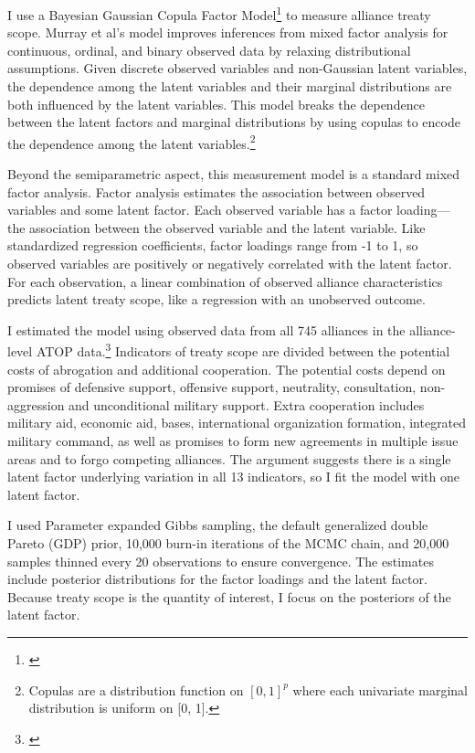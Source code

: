 \documentclass[12pt]{article}
\begin{document}
I use a Bayesian Gaussian Copula Factor Model\footnote{\cite{Murrayetal2013}} to measure alliance treaty scope. 
Murray et al's model improves inferences from mixed factor analysis for continuous, ordinal, and binary observed data by relaxing distributional assumptions. 
Given discrete observed variables and non-Gaussian latent variables, the dependence among the latent variables and their marginal distributions are both influenced by the latent variables.
This model breaks the dependence between the latent factors and marginal distributions by using copulas to encode the dependence among the latent variables.\footnote{Copulas are a distribution function on $[0, 1]^p$ where each univariate marginal distribution is uniform on [0, 1].}


Beyond the semiparametric aspect, this measurement model is a standard mixed factor analysis.
Factor analysis estimates the association between observed variables and some latent factor.
Each observed variable has a factor loading--- the association between the observed variable and the latent variable.  
Like standardized regression coefficients, factor loadings range from -1 to 1, so observed variables are positively or negatively correlated with the latent factor.  
For each observation, a linear combination of observed alliance characteristics predicts latent treaty scope, like a regression with an unobserved outcome.  


I estimated the model using observed data from all 745 alliances in the alliance-level ATOP data.\footnote{\cite{Leedsetal2002}}
Indicators of treaty scope are divided between the potential costs of abrogation and additional cooperation.
The potential costs depend on promises of defensive support, offensive support, neutrality, consultation, non-aggression and unconditional military support. 
Extra cooperation includes military aid, economic aid, bases, international organization formation, integrated military command, as well as promises to form new agreements in multiple issue areas and to forgo competing alliances. 
The argument suggests there is a single latent factor underlying variation in all 13 indicators, so I fit the model with one latent factor. 


I used Parameter expanded Gibbs sampling, the default generalized double Pareto (GDP) prior, 10,000 burn-in iterations of the MCMC chain, and 20,000 samples thinned every 20 observations to ensure convergence. 
The estimates include posterior distributions for the factor loadings and the latent factor. 
Because treaty scope is the quantity of interest, I focus on the posteriors of the latent factor. 
\end{document}
